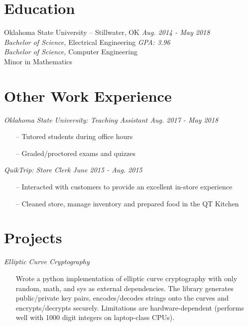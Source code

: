 \documentclass[line,overlapped,9pt]{res}
\begin{document}
\begin{resume}
      \section{Education} Oklahoma State University -- Stillwater, OK \hfill {\sl Aug. 2014 - May 2018} \\
            {\sl Bachelor of Science,} Electrical Engineering \hfill {\sl GPA: 3.96}\\
            {\sl Bachelor of Science,} Computer Engineering \\
            Minor in Mathematics 
                
    \section{Other Work Experience}

            {\sl Oklahoma State University: Teaching Assistant \hfill Aug. 2017 - May 2018}
            \begin{itemize}  %
            \item[--] Tutored students during office hours 
            \item[--] Graded/proctored exams and quizzes
            \end{itemize} 

            {\sl QuikTrip: Store Clerk \hfill June 2015 - Aug. 2015}
            \begin{itemize} 
            \item[--] Interacted with customers to provide an excellent in-store experience 
            \item[--] Cleaned store, manage inventory and prepared food in the QT Kitchen 
            \end{itemize}

     \section{Projects}
             
            {\sl Elliptic Curve Cryptography} 
            \begin{itemize} 
            \item[] Wrote a python implementation of elliptic curve cryptography with only random, math, and sys
              as external dependencies. The library generates public/private key pairs, encodes/decodes strings
              onto the curves and encrypts/decrypts securely. Limitations are hardware-dependent (performs well
              with 1000 digit integers on laptop-class CPUs). 
              \end{itemize}
       
\end{resume}
\end{document}
